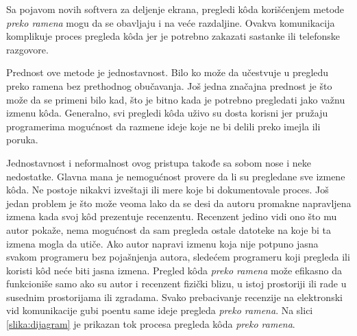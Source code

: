 \documentclass[a4paper]{article}
\begin{document}
    Sa pojavom novih softvera za deljenje ekrana, pregledi kôda korišćenjem metode \textit{preko ramena} mogu da se obavljaju i na veće razdaljine. Ovakva komunikacija komplikuje proces pregleda kôda jer je potrebno zakazati sastanke ili telefonske razgovore.
    
    Prednost ove metode je jednostavnost. Bilo ko može da učestvuje u pregledu preko ramena bez prethodnog obučavanja. Još jedna značajna prednost je što može da se primeni bilo kad, što je bitno kada je potrebno pregledati jako važnu izmenu kôda. Generalno, svi pregledi kôda uživo su dosta korisni jer pružaju programerima mogućnost da razmene ideje koje ne bi delili preko imejla ili poruka.
    
    Jednostavnost i neformalnost ovog pristupa takođe sa sobom nose i neke nedostatke. Glavna mana je nemogućnost provere da li su pregledane sve izmene kôda. Ne postoje nikakvi izveštaji ili mere koje bi dokumentovale proces. Još jedan problem je što može veoma lako da se desi da autoru promakne napravljena izmena kada svoj kôd prezentuje recenzentu. Recenzent jedino vidi ono što mu autor pokaže, nema mogućnost da sam pregleda ostale datoteke na koje bi ta izmena mogla da utiče. Ako autor napravi izmenu koja nije potpuno jasna svakom programeru bez pojašnjenja autora, sledećem programeru koji pregleda ili koristi kôd neće biti jasna izmena. Pregled kôda \textit{preko ramena} može efikasno da funkcioniše samo ako su autor i recenzent fizički blizu, u istoj prostoriji ili rade u susednim prostorijama ili zgradama. Svako prebacivanje recenzije na elektronski vid komunikacije gubi poentu same ideje pregleda \textit{preko ramena}.
    Na slici \ref{slika:dijagram} je prikazan tok procesa pregleda kôda \textit{preko ramena}. \cite{bkspcr}
    
\end{document}

